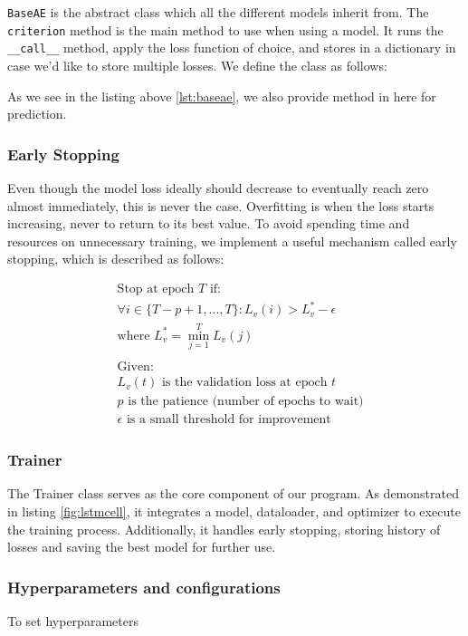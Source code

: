 \lstinline{BaseAE} is the abstract class which all the different models inherit from. The \lstinline{criterion} method is the main method to use when using a model. It runs the \lstinline{__call__} method, apply the loss function of choice, and stores in a dictionary in case we'd like to store multiple losses. We define the class as follows:



As we see in the listing above \ref{lst:baseae}, we also provide method in here for prediction. 

\subsubsection{Early Stopping}

Even though the model loss ideally should decrease to eventually reach zero almost immediately, this is never the case. Overfitting is when the loss starts increasing, never to return to its best value. To avoid spending time and resources on unnecessary training, we implement a useful mechanism called early stopping, which is described as follows:


\begin{align*}
&\text{Stop at epoch } T \text{ if:} \\
&\forall i \in \{T-p+1, ..., T\}: L_v(i) > L_v^* - \epsilon \\
&\text{where } L_v^* = \min_{j=1}^{T} L_v(j) \\
\\
&\text{Given:} \\
&L_v(t) \text{ is the validation loss at epoch } t \\
&p \text{ is the patience (number of epochs to wait)} \\
&\epsilon \text{ is a small threshold for improvement}
\end{align*}

\subsubsection{Trainer}

The Trainer class serves as the core component of our program. As demonstrated in listing \ref{fig:lstmcell}, it integrates a model, dataloader, and optimizer to execute the training process. Additionally, it handles early stopping, storing history of losses and saving the best model for further use.

\subsubsection{Hyperparameters and configurations}

To set hyperparameters 